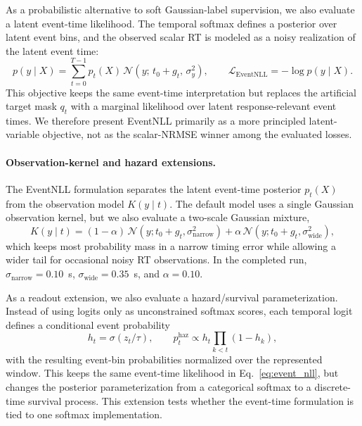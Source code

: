 \documentclass[12pt]{article}
\begin{document}
As a probabilistic alternative to soft Gaussian-label supervision, we also evaluate a latent event-time likelihood. The temporal softmax defines a posterior over latent event bins, and the observed scalar RT is modeled as a noisy realization of the latent event time:
\begin{equation}
\label{eq:event_nll}
p(y\mid X)
= \sum_{t=0}^{T-1} p_t(X)\,
\mathcal{N}\!\left(y;\,t_0 + g_t,\,\sigma_y^2\right),
\qquad
\mathcal{L}_{\mathrm{EventNLL}} = -\log p(y\mid X).
\end{equation}
This objective keeps the same event-time interpretation but replaces the artificial target mask $q_t$ with a marginal likelihood over latent response-relevant event times. We therefore present EventNLL primarily as a more principled latent-variable objective, not as the scalar-NRMSE winner among the evaluated losses.

\paragraph{Observation-kernel and hazard extensions.}
The EventNLL formulation separates the latent event-time posterior $p_t(X)$ from the observation model $K(y\mid t)$. The default model uses a single Gaussian observation kernel, but we also evaluate a two-scale Gaussian mixture,
\begin{equation}
\label{eq:event_nll_mixture_kernel}
K(y\mid t)=(1-\alpha)\,\mathcal{N}(y;t_0+g_t,\sigma_{\mathrm{narrow}}^2)
+\alpha\,\mathcal{N}(y;t_0+g_t,\sigma_{\mathrm{wide}}^2),
\end{equation}
which keeps most probability mass in a narrow timing error while allowing a wider tail for occasional noisy RT observations. In the completed run, $\sigma_{\mathrm{narrow}}=0.10$~s, $\sigma_{\mathrm{wide}}=0.35$~s, and $\alpha=0.10$.

As a readout extension, we also evaluate a hazard/survival parameterization. Instead of using logits only as unconstrained softmax scores, each temporal logit defines a conditional event probability
\begin{equation}
\label{eq:hazard_readout}
h_t=\sigma(z_t/\tau),\qquad
p_t^{\mathrm{haz}} \propto h_t\prod_{k<t}(1-h_k),
\end{equation}
with the resulting event-bin probabilities normalized over the represented window. This keeps the same event-time likelihood in Eq.~\ref{eq:event_nll}, but changes the posterior parameterization from a categorical softmax to a discrete-time survival process. This extension tests whether the event-time formulation is tied to one softmax implementation.
\end{document}
